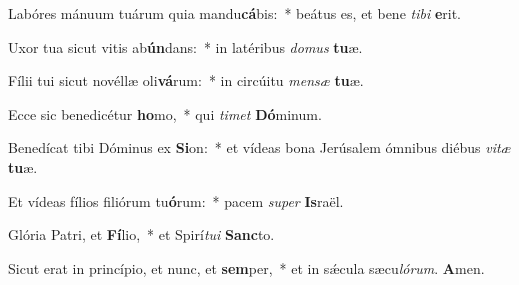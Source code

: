 Labóres mánuum tuárum quia mandu\textbf{cá}bis:~* beátus es, et bene \textit{ti}\textit{bi} \textbf{e}rit.

Uxor tua sicut vitis ab\textbf{ún}dans:~* in latéribus \textit{do}\textit{mus} \textbf{tu}æ.

Fílii tui sicut novéllæ oli\textbf{vá}rum:~* in circúitu \textit{men}\textit{sæ} \textbf{tu}æ.

Ecce sic benedicétur \textbf{ho}mo,~* qui \textit{ti}\textit{met} \textbf{Dó}minum.

Benedícat tibi Dóminus ex \textbf{Si}on:~* et vídeas bona Jerúsalem ómnibus diébus \textit{vi}\textit{tæ} \textbf{tu}æ.

Et vídeas fílios filiórum tu\textbf{ó}rum:~* pacem \textit{su}\textit{per} \textbf{Is}raël.

Glória Patri, et \textbf{Fí}lio,~* et Spirí\textit{tu}\textit{i} \textbf{Sanc}to.

Sicut erat in princípio, et nunc, et \textbf{sem}per,~* et in sǽcula sæcu\textit{ló}\textit{rum}. \textbf{A}men.

